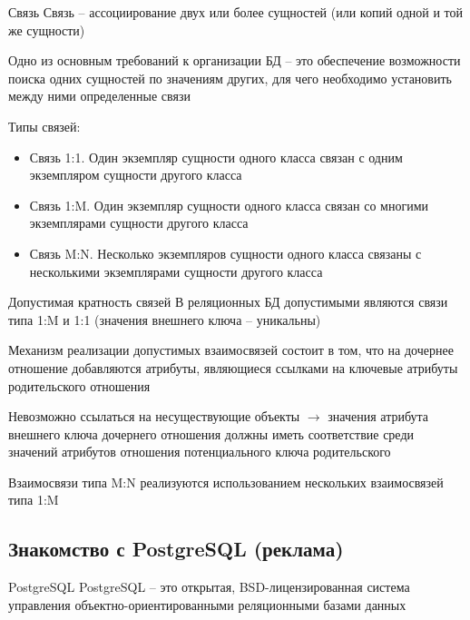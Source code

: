 \documentclass[12pt]{article}
\begin{document}
\begin{defin}{Связь}
    Связь -- ассоциирование двух или более сущностей (или копий одной и той же сущности)

    Одно из основным требований к организации БД -- это обеспечение возможности поиска одних сущностей по значениям других, для чего необходимо установить между ними определенные связи 

    Типы связей:

    \begin{itemize}
        \item Связь 1:1. Один экземпляр сущности одного класса связан с одним экземпляром сущности другого класса
        \item Связь 1:M. Один экземпляр сущности одного класса связан со многими экземплярами сущности другого класса 
        \item Связь M:N. Несколько экземпляров сущности одного класса связаны с несколькими экземплярами сущности другого класса
    \end{itemize}
\end{defin}

\begin{nota}{Допустимая кратность связей}
    В реляционных БД допустимыми являются связи типа 1:M и 1:1 (значения внешнего ключа -- уникальны)

    Механизм реализации допустимых взаимосвязей состоит в том, что на дочернее отношение добавляются атрибуты, являющиеся ссылками на ключевые атрибуты родительского отношения 

    Невозможно ссылаться на несуществующие объекты $\to$ значения атрибута внешнего ключа дочернего отношения должны иметь соответствие среди значений атрибутов отношения потенциального ключа родительского

    Взаимосвязи типа M:N реализуются использованием нескольких взаимосвязей типа 1:M
\end{nota}

\newpage

\subsection{Знакомство с PostgreSQL (реклама)}

\begin{defin}{PostgreSQL}
    PostgreSQL -- это открытая, BSD-лицензированная система управления объектно-ориентированными реляционными базами данных 
\end{defin}
\end{document}
